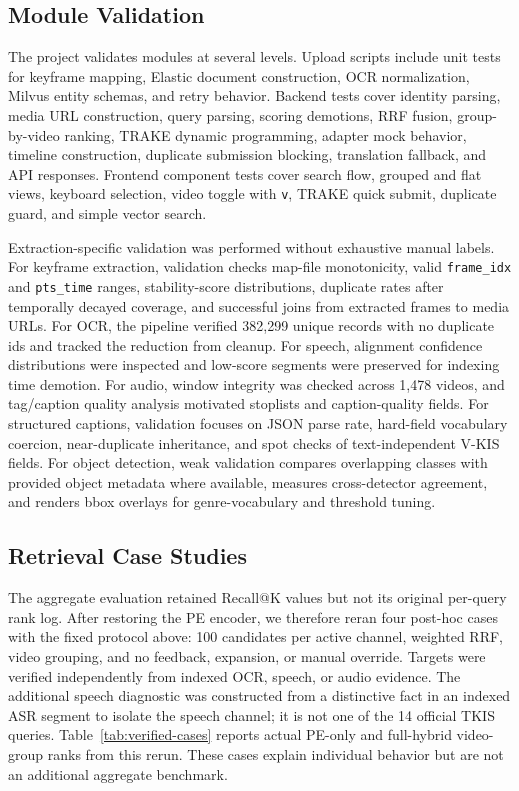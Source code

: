 \documentclass[conference]{IEEEtran}
\newcommand{\fid}{\texttt{frame\_idx}}
\newcommand{\ptstime}{\texttt{pts\_time}}
\begin{document}
\subsection{Module Validation}

The project validates modules at several levels. Upload scripts include unit
tests for keyframe mapping, Elastic document construction, OCR normalization,
Milvus entity schemas, and retry behavior. Backend tests cover identity parsing,
media URL construction, query parsing, scoring demotions, RRF fusion,
group-by-video ranking, TRAKE dynamic programming, adapter mock behavior,
timeline construction, duplicate submission blocking, translation fallback, and
API responses. Frontend component tests cover search flow, grouped and flat
views, keyboard selection, video toggle with \texttt{v}, TRAKE quick submit,
duplicate guard, and simple vector search.

Extraction-specific validation was performed without exhaustive manual labels.
For keyframe extraction, validation checks map-file monotonicity, valid
\fid{} and \ptstime{} ranges, stability-score distributions, duplicate rates
after temporally decayed coverage, and successful joins from extracted frames to
media URLs. For OCR, the pipeline verified 382,299 unique records with no
duplicate ids and tracked the reduction from cleanup. For speech, alignment
confidence distributions were inspected and low-score segments were preserved
for indexing time demotion. For audio, window integrity was checked across 1,478
videos, and tag/caption quality analysis motivated stoplists and caption-quality
fields. For structured captions, validation focuses on JSON parse rate,
hard-field vocabulary coercion, near-duplicate inheritance, and spot checks of
text-independent V-KIS fields. For object detection, weak validation compares
overlapping classes with provided object metadata where available, measures
cross-detector agreement, and renders bbox overlays for genre-vocabulary and
threshold tuning.

\subsection{Retrieval Case Studies}

The aggregate evaluation retained Recall@K values but not its original
per-query rank log. After restoring the PE encoder, we therefore reran four
post-hoc cases with the fixed protocol above: 100 candidates per active channel,
weighted RRF, video grouping, and no feedback, expansion, or manual override.
Targets were verified independently from indexed OCR, speech, or audio evidence.
The additional speech diagnostic was constructed from a distinctive fact in an
indexed ASR segment to isolate the speech channel; it is not one of the 14
official TKIS queries. Table~\ref{tab:verified-cases} reports actual PE-only and
full-hybrid video-group ranks from this rerun. These cases explain individual
behavior but are not an additional aggregate benchmark.
\end{document}
